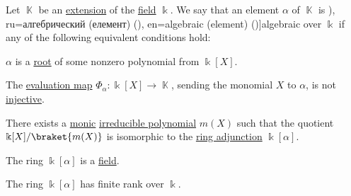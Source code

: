 \begin{definition}\label{def:algebraic_element}
  Let \( \BbbK \) be an \hyperref[def:field/subobject]{extension} of the \hyperref[def:field]{field} \( \Bbbk \). We say that an element \( \alpha \) of \( \BbbK \) is \term[bg=алгебричен (елемент) (\cite[422]{Обрешков1962ВисшаАлгебра}), ru=алгебрический (елемент) (\cite[407]{Винберг2014КурсАлгебры}), en=algebraic (element) (\cite[124]{Jacobson1985BasicAlgebraI})]{algebraic} over \( \Bbbk \) if any of the following equivalent conditions hold:
  \begin{thmenum}
     \( \alpha \) is a \hyperref[def:polynomial_root]{root} of some nonzero polynomial from \( \Bbbk[X] \).

    \mimprovised The \hyperref[con:free_construction/evaluation]{evaluation map} \( \Phi_\alpha: \Bbbk[X] \to \BbbK \), sending the monomial \( X \) to \( \alpha \), is not \hyperref[def:function_invertibility/injective]{injective}.

     There exists a \hyperref[def:monic_polynomial]{monic} \hyperref[def:domain_divisibility/irreducible]{irreducible polynomial} \( m(X) \) such that the quotient \( \Bbbk[X] / \braket{ m(X) } \) is isomorphic to the \hyperref[def:semiring_adjunction]{ring adjunction} \( \Bbbk[\alpha] \).

    \mimprovised The ring \( \Bbbk[\alpha] \) is a \hyperref[def:field]{field}.

    \mimprovised The ring \( \Bbbk[\alpha] \) has finite rank over \( \Bbbk \).
  \end{thmenum}
\end{definition}
